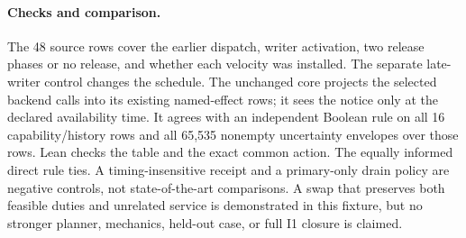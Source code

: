 \documentclass{article}
\begin{document}
\paragraph{Checks and comparison.}
The 48 source rows cover the earlier dispatch, writer activation,
two release phases or no release, and whether each velocity was
installed. The separate late-writer control changes the schedule.
The unchanged core projects the selected backend calls into
its existing named-effect rows; it sees the notice only at the declared
availability time. It agrees with an independent Boolean rule on
all 16 capability/history rows and all 65,535 nonempty uncertainty
envelopes over those rows. Lean checks the table and the exact
common action. The equally informed direct rule ties.
A timing-insensitive receipt and a primary-only drain policy are
negative controls, not state-of-the-art comparisons. A swap that
preserves both feasible duties and unrelated service is demonstrated
in this fixture, but no stronger planner, mechanics, held-out case,
or full I1 closure is claimed.
\end{document}
